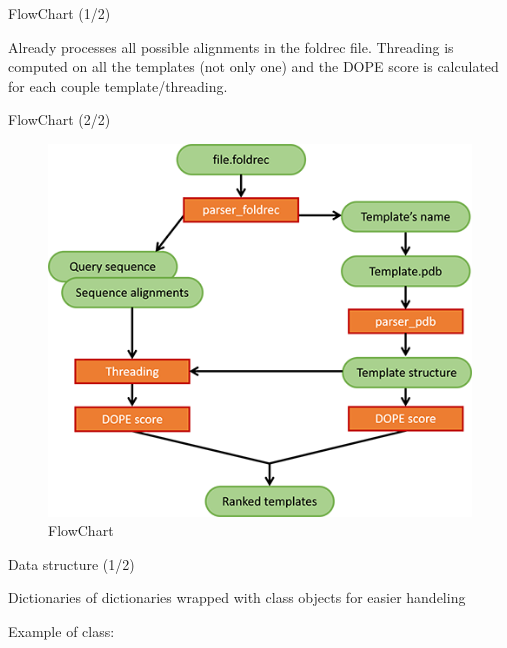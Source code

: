 \begin{frame}{FlowChart (1/2)}

Already processes all possible alignments in the foldrec file. Threading
is computed on all the templates (not only one) and the DOPE score is
calculated for each couple template/threading.

\end{frame}

\begin{frame}{FlowChart (2/2)}

\begin{figure}
\centering
\includegraphics{FlowChart.png}
\caption{FlowChart}
\end{figure}

\end{frame}

\begin{frame}[fragile]{Data structure (1/2)}

Dictionaries of dictionaries wrapped with class objects for easier
handeling

Example of class:

\begin{Shaded}
\begin{Highlighting}[]
 \NormalTok{(}
            \NormalTok{: }\NormalTok{,}
\NormalTok{,}
\NormalTok{,}
\NormalTok{,}
\NormalTok{            ) }\OperatorTok{->} \NormalTok{:}
    \OperatorTok{=}
    \OperatorTok{=}
    \OperatorTok{=}
\end{Highlighting}
\end{Shaded}

\end{frame}

